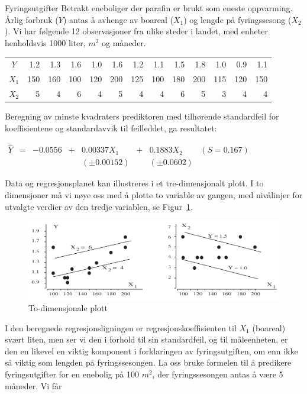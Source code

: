 \begin{eksempel}{Fyringsutgifter}
Betrakt eneboliger der parafin er brukt som eneste oppvarming. Årlig
forbruk ($Y$) antas å avhenge av boareal ($X_1$) og lengde på
fyringssesong ($X_2$). Vi har følgende 12 observasjoner fra ulike steder i
landet, med enheter henholdsvis 1000 liter, $m^2$ og måneder.
\begin{center} \addtolength{\tabcolsep}{-0.2\tabcolsep}
\begin{tabular}{|c|rrrrrrrrrrrr|} \hline
 $Y$  &1.2&1.3&1.6&1.0&1.6&1.2&1.1&1.5&1.8&1.0&0.9&1.1 \\
 $X_1$&150&160&100&120&200&125&100&180&200&115&120&150  \\
 $X_2$& 5& 4& 6& 4& 5& 4& 4& 6& 5& 3& 4& 4 \\ \hline
\end{tabular}
\end{center}
Beregning av minste kvadraters prediktoren med tilhørende standardfeil for
koeffisientene og standardavvik til feilleddet, ga resultatet:

\begin{center} $
 \begin{array}{cccccccc}
 \hat{Y}&=&-0.0556&+&0.00337X_1&+&0.1883X_2& (S=0.167)  \\
        & & &   &(\pm 0.00152)& &(\pm 0.0602)&   
 \end{array} $
\end{center}
Data og regresjonsplanet kan illustreres i et tre-dimensjonalt plott.
I to dimensjoner må vi nøye oss med å plotte to variable av gangen,
med nivålinjer for utvalgte verdier av den tredje variablen, se Figur~\ref{fig:2dim_plott}.
\begin{figure}[ht]
\centering
  \includegraphics[scale=0.7]{figurer/fig12_1.pdf}
 \caption{To-dimensjonale plott}
	\label{fig:2dim_plott}
\end{figure}

I den beregnede regresjonsligningen er regresjonskoeffisienten til
 $X_1$ (boareal) svært liten, 
men ser vi den i forhold til sin standardfeil, og til måleenheten, er
den en likevel en viktig komponent i forklaringen av fy\-rings\-utgiften, om
enn ikke så viktig som lengden på fyringssesongen. La oss bruke
formelen  til å predikere fyringsutgifter for en enebolig på
100 $m^2$, der  fyringssesongen antas å være 5 måneder. Vi får


\end{eksempel}

